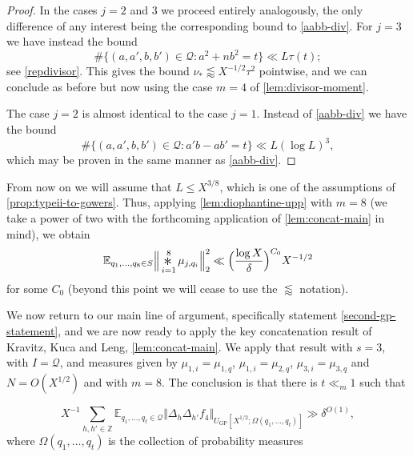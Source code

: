 \documentclass[11pt,reqno]{amsart}
\numberwithin{equation}{section}
\theoremstyle{definition}
\theoremstyle{remark}
\newcommand{\mb}{\mathbb}
\newcommand{\mc}{\mathcal}
\renewcommand{\le}{\leqslant}
\newcommand\E{\mb{E}}
\newcommand\GP{\operatorname{GP}}
\newcommand{\conv}{\mathop{\scalebox{1.5}{\raisebox{-0.2ex}{$\ast$}}}}
\begin{document}
\begin{proof}
In the cases $j = 2$ and $3$ we proceed entirely analogously, the only difference of any interest being the corresponding bound to \cref{aabb-div}. For $j = 3$ we have instead the bound
\begin{equation}\label{aabb-div-2}
\#\{(a, a', b, b') \in \mc{Q}: a^2 + nb^2 = t\} \ll L \tau(t);
\end{equation}
see \cref{repdivisor}. This gives the bound $\nu_* \lessapprox X^{-1/2} \tau^2$ pointwise, and we can conclude as before but now using the case $m = 4$ of \cref{lem:divisor-moment}.

The case $j = 2$ is almost identical to the case $j = 1$. Instead of \cref{aabb-div} we have the bound
\begin{equation}\label{aabb-div-3}
\#\{(a, a', b, b') \in \mc{Q} : a'b - ab' = t\} \ll L(\log L)^3 ,
\end{equation}
which may be proven in the same manner as \cref{aabb-div}.
\end{proof}

From now on we will assume that $L \le X^{3/8}$, which is one of the assumptions of \cref{prop:typeii-to-gowers}. Thus, applying \cref{lem:diophantine-upp} with $m = 8$ (we take a power of two with the forthcoming application of \cref{lem:concat-main} in mind), we obtain
\begin{equation}\label{lem71-cor} \E_{q_1,\dots, q_{8} \in S} \Big\Vert \conv_{i=1}^{8} \mu_{j,q_i}\Big\Vert^2_{2} \ll \Big(\frac{\log X}{\delta}\Big)^{C_0} X^{-1/2} \end{equation} for some $C_0$ (beyond this point we will cease to use the $\lessapprox$ notation).

We now return to our main line of argument, specifically statement \cref{second-gp-statement}, and we are now ready to apply the key concatenation result of Kravitz, Kuca and Leng, \cref{lem:concat-main}. We apply that result with $s = 3$, with $I = \mc{Q}$, and measures given by $\mu_{1,i} = \mu_{1,q}$, $\mu_{1,i} = \mu_{2,q}$, $\mu_{3,i} = \mu_{3,q}$ and $N = O(X^{1/2})$ and with $m = 8$. The conclusion is that there is $t \ll_{m} 1$ such that 

\begin{equation}\label{concat-conclu} X^{-1}\sum_{h,h'\in \mb{Z}} \E_{q_1,\dots, q_t \in \mc{Q}} \Vert \Delta_{h} \Delta_{h'} f_4 \Vert_{U_{\GP}[X^{1/2}; \Omega(q_1,\dots, q_t)]} \gg \delta^{O(1)} ,\end{equation}
where $\Omega(q_1,\dots, q_t)$ is the collection of probability measures
\end{document}
